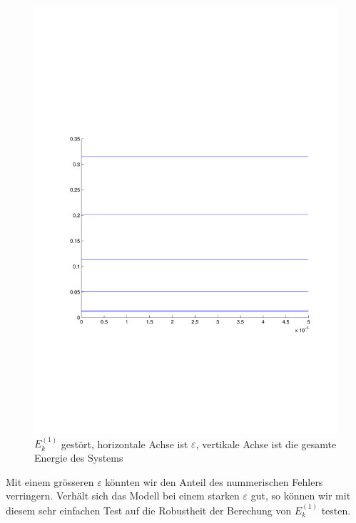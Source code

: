 \begin{refsection}
\begin{figure}
 \centering
 \includegraphics[width=12cm,clip=true,trim=2cm 7cm 1cm 8cm]{efeld/Energie_gestoert.pdf}
 \caption{$E_k^{(1)}$ gest\"ort, horizontale Achse ist $\varepsilon$, vertikale Achse ist die gesamte Energie des Systems}
 \label{abb:efeld_E_gestoert}
\end{figure}

Mit einem gr\"osseren $\varepsilon$ k\"onnten wir den Anteil des nummerischen Fehlers verringern. 
Verh\"alt sich das Modell bei einem starken $\varepsilon$ gut, so k\"onnen wir mit diesem sehr einfachen Test
auf die Robustheit der Berechung von $E_k^{(1)}$ testen.





\printbibliography[heading=subbibliography]
\end{refsection}
